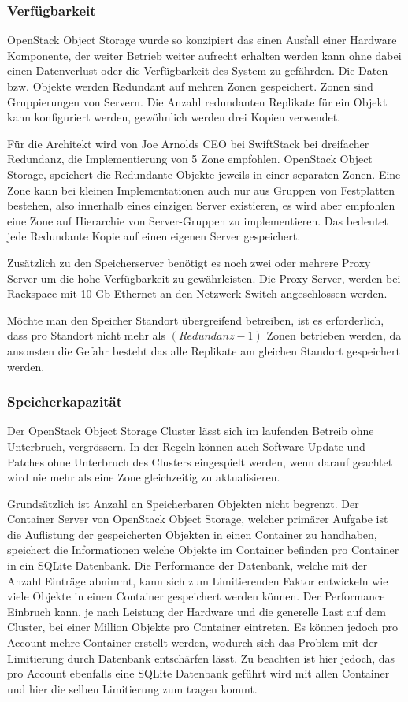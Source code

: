 \subsubsection*{Verfügbarkeit}
OpenStack Object Storage wurde so konzipiert das einen Ausfall einer Hardware Komponente, der weiter Betrieb weiter aufrecht erhalten werden kann ohne dabei einen Datenverlust oder die Verfügbarkeit des System zu gefährden. Die Daten bzw. Objekte werden Redundant auf mehren Zonen gespeichert. Zonen sind Gruppierungen von Servern. Die Anzahl redundanten Replikate für ein Objekt kann konfiguriert werden, gewöhnlich werden drei Kopien verwendet.

Für die Architekt wird von Joe Arnolds CEO bei SwiftStack bei dreifacher Redundanz, die Implementierung von 5 Zone empfohlen. OpenStack Object Storage, speichert die Redundante Objekte jeweils in einer separaten Zonen. Eine Zone kann bei kleinen Implementationen auch nur aus Gruppen von Festplatten bestehen, also innerhalb eines einzigen Server existieren, es wird aber empfohlen eine Zone auf Hierarchie von Server-Gruppen zu implementieren. Das bedeutet jede Redundante Kopie auf einen eigenen Server gespeichert. \cite{Arnold} 

Zusätzlich zu den Speicherserver benötigt es noch zwei oder mehrere Proxy Server um die hohe Verfügbarkeit zu gewährleisten. Die Proxy Server, werden bei Rackspace mit 10 Gb Ethernet an den Netzwerk-Switch angeschlossen werden. \cite{OpenStack2011}

Möchte man den Speicher Standort übergreifend betreiben, ist es erforderlich, dass pro Standort nicht mehr als $(Redundanz -1)$ Zonen betrieben werden, da ansonsten die Gefahr besteht das alle Replikate am gleichen Standort gespeichert werden.

\subsubsection*{Speicherkapazität}
Der OpenStack Object Storage Cluster lässt sich im laufenden Betreib ohne Unterbruch, vergrössern. In der Regeln können auch Software Update und Patches ohne Unterbruch des Clusters eingespielt werden, wenn darauf geachtet wird nie mehr als eine Zone gleichzeitig zu aktualisieren.

Grundsätzlich ist Anzahl an Speicherbaren Objekten nicht begrenzt. Der Container Server von OpenStack Object Storage, welcher primärer Aufgabe ist die Auflistung der gespeicherten Objekten in einen Container zu handhaben, speichert die Informationen welche Objekte im Container befinden pro Container in ein SQLite Datenbank. Die Performance der Datenbank, welche mit der Anzahl Einträge abnimmt, kann sich zum Limitierenden Faktor entwickeln wie viele Objekte in einen Container gespeichert werden können. Der Performance Einbruch kann, je nach Leistung der Hardware und die generelle Last auf dem Cluster, bei einer Million Objekte pro Container eintreten. Es können jedoch pro Account mehre Container erstellt werden, wodurch sich das Problem mit der Limitierung durch Datenbank entschärfen lässt. Zu beachten ist hier jedoch, das pro Account ebenfalls eine SQLite Datenbank geführt wird mit allen Container und hier die selben Limitierung zum tragen kommt. \cite{OpenStack2012}\cite{A2011}

